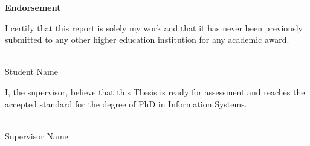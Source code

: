 \clearpage
\thispagestyle{empty}
\vspace*{\fill}

\begin{center}
    \textbf{\Huge Endorsement}
\end{center}

\vspace{2cm}

\begin{minipage}[t]{0.45\textwidth}
    I certify that this report is solely my work and that it has never been previously submitted to any other higher education institution for any academic award.
    \vspace{2cm} \\
   
    \hrulefill \\
    \vspace{0.5cm}

    
    \centering
    Student Name
\end{minipage}
\hfill
\begin{minipage}[t]{0.45\textwidth}
    I, the supervisor, believe that this Thesis is ready for assessment and reaches the accepted standard for the degree of PhD in Information Systems.
    \vspace{2cm} \\
    
    \hrulefill \\
    \vspace{0.5cm}
    
    \centering
    Supervisor Name
\end{minipage}

\vspace*{\fill}
\clearpage